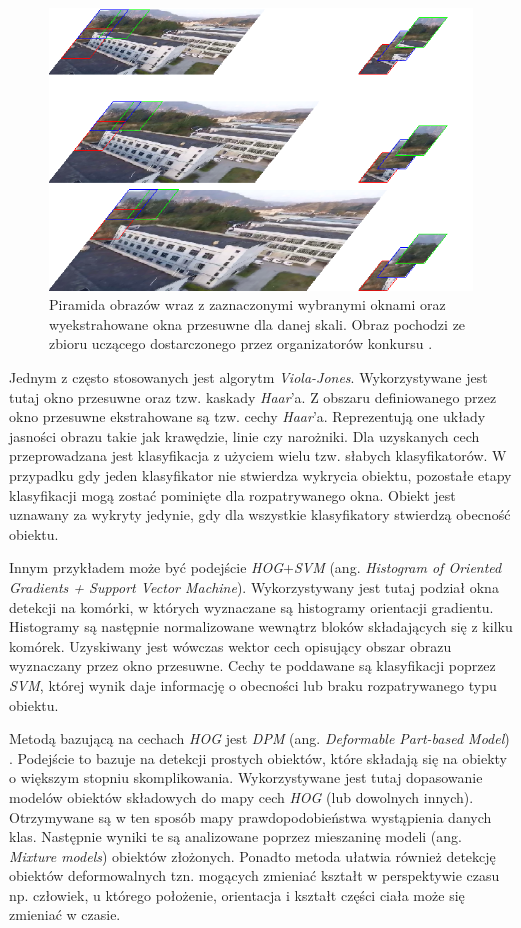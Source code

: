 \begin{figure}
    \centering
    \includegraphics[width=0.9\linewidth]{images/piramid.png}
    \caption{Piramida obrazów wraz z zaznaczonymi wybranymi oknami oraz wyekstrahowane okna przesuwne dla danej skali. Obraz pochodzi ze zbioru uczącego dostarczonego przez organizatorów konkursu \cite{dac_sdc_2021}.}
    \label{fig:sliding_window}
\end{figure}


Jednym z często stosowanych jest algorytm \emph{Viola-Jones}\cite{viola_jones}. 
Wykorzystywane jest tutaj okno przesuwne oraz tzw. kaskady \emph{Haar}'a.
Z obszaru definiowanego przez okno przesuwne ekstrahowane są tzw. cechy \emph{Haar}'a.
Reprezentują one układy jasności obrazu takie jak krawędzie, linie czy narożniki. 
Dla uzyskanych cech przeprowadzana jest klasyfikacja z użyciem wielu tzw. słabych klasyfikatorów.
W przypadku gdy jeden klasyfikator nie stwierdza wykrycia obiektu, pozostałe etapy klasyfikacji mogą zostać pominięte dla rozpatrywanego okna.
Obiekt jest uznawany za wykryty jedynie, gdy dla wszystkie klasyfikatory stwierdzą obecność obiektu. 

Innym przykładem może być podejście \emph{HOG}+\emph{SVM}\cite{hog} (ang. \emph{Histogram of Oriented Gradients + Support Vector Machine}). 
Wykorzystywany jest tutaj podział okna detekcji na komórki, w których wyznaczane są histogramy orientacji gradientu. 
Histogramy są następnie normalizowane wewnątrz bloków składających się z kilku komórek. 
Uzyskiwany jest wówczas wektor cech opisujący obszar obrazu wyznaczany przez okno przesuwne. 
Cechy te poddawane są klasyfikacji poprzez \emph{SVM}, której wynik daje informację o obecności lub braku rozpatrywanego typu obiektu.

Metodą bazującą na cechach \emph{HOG} jest \emph{DPM} (ang. \emph{Deformable Part-based Model}) \cite{model_based}.
Podejście to bazuje na detekcji prostych obiektów, które składają się na obiekty o większym stopniu skomplikowania.
Wykorzystywane jest tutaj dopasowanie modelów obiektów składowych do mapy cech \emph{HOG} (lub dowolnych innych).
Otrzymywane są w ten sposób mapy prawdopodobieństwa wystąpienia danych klas.
Następnie wyniki te są analizowane poprzez mieszaninę modeli (ang. \emph{Mixture models}) obiektów złożonych.
Ponadto metoda ułatwia również detekcję obiektów deformowalnych tzn. mogących zmieniać kształt w perspektywie czasu np. człowiek, u którego położenie, orientacja i kształt części ciała może się zmieniać w czasie.


